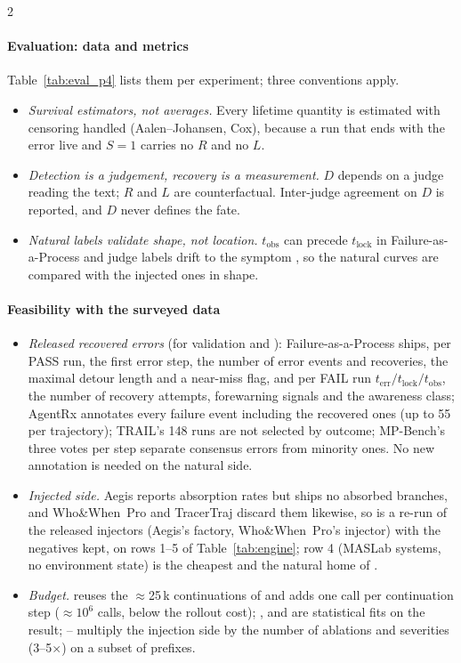 \begin{multicols}{2}
\paragraph{Evaluation: data and metrics} Table~\ref{tab:eval_p4} lists them per experiment; three conventions apply.
\begin{itemize}[leftmargin=1.1em]
\item \emph{Survival estimators, not averages.} Every lifetime quantity is estimated with censoring handled (Aalen--Johansen, Cox), because a run that ends with the error live and $S{=}1$ carries no $R$ and no $L$.
\item \emph{Detection is a judgement, recovery is a measurement.} $D$ depends on a judge reading the text; $R$ and $L$ are counterfactual. Inter-judge agreement on $D$ is reported, and $D$ never defines the fate.
\item \emph{Natural labels validate shape, not location.} $t_{\mathrm{obs}}$ can precede $t_{\mathrm{lock}}$ in Failure-as-a-Process and judge labels drift to the symptom \cite{shen2026epv}, so the natural curves are compared with the injected ones in shape.
\end{itemize}

\paragraph{Feasibility with the surveyed data}
\begin{itemize}[leftmargin=1.1em]
\item \emph{Released recovered errors} (for  validation and ): Failure-as-a-Process ships, per PASS run, the first error step, the number of error events and recoveries, the maximal detour length and a near-miss flag, and per FAIL run $t_{\mathrm{err}}/t_{\mathrm{lock}}/t_{\mathrm{obs}}$, the number of recovery attempts, forewarning signals and the awareness class; AgentRx annotates every failure event including the recovered ones (up to 55 per trajectory); TRAIL's 148 runs are not selected by outcome; MP-Bench's three votes per step separate consensus errors from minority ones. No new annotation is needed on the natural side.
\item \emph{Injected side.} Aegis reports absorption rates but ships no absorbed branches, and Who\&When~Pro and TracerTraj discard them likewise, so  is a re-run of the released injectors (Aegis's factory, Who\&When~Pro's injector) with the negatives kept, on rows 1--5 of Table~\ref{tab:engine}; row 4 (MASLab systems, no environment state) is the cheapest and the natural home of .
\item \emph{Budget.}  reuses the $\approx$25\,k continuations of  and adds one call per continuation step ($\approx10^6$ calls, below the rollout cost); ,  and  are statistical fits on the result; -- multiply the injection side by the number of ablations and severities (3--5$\times$) on a subset of prefixes.
\end{itemize}


\end{multicols}
